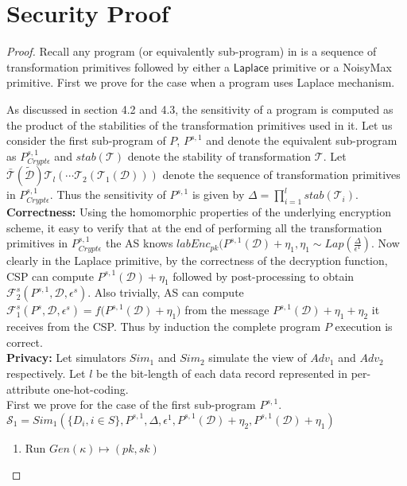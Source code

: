 \section{Security Proof}
\begin{proof}
Recall any program (or equivalently sub-program) in \system is a sequence of transformation primitives followed by either a $\textsf{Laplace}$ primitive or a \textsf{NoisyMax} primitive. First we prove for the case when a program uses Laplace mechanism.

As discussed in section 4.2 and 4.3, the sensitivity of a \system program is computed as the product of the stabilities of the transformation primitives used in it.
Let us consider the first sub-program of $P$, $P^{s,1}$ and denote the equivalent \system sub-program as $P^{s,1}_{Crypt\epsilon}$ and $stab(\mathcal{T})$ denote the stability of transformation $\mathcal{T}$. Let $\bar{\mathcal{T}}(\boldsymbol{\tilde{\mathcal{D}}})\mathcal{T}_l(\cdots\mathcal{T}_2(\mathcal{T}_1(\mathcal{D})))$ denote the sequence of transformation primitives in $P^{s,1}_{Crypt\epsilon}$. Thus the sensitivity of $P^{s,1}$ is given by $\Delta=\prod_{i=1}^l stab(\mathcal{T}_i)$.\\
\textbf{Correctness:}
 Using the homomorphic properties of the underlying encryption
scheme, it easy to verify that at the end of performing all the transformation primitives in $P^{s,1}_{Crypt\epsilon}$ the \textsf{AS} knows $labEnc_{pk}(P^{s,1}(\mathcal{D})+\eta_1, \eta_1 \sim Lap(\frac{\Delta}{\epsilon^1})$.  Now clearly in the \textsf{Laplace} primitive, by the correctness of the decryption function, \textsf{CSP} can compute $P^{s,1}(\mathcal{D})+\eta_1$ followed by post-processing to obtain $\mathcal{F}^s_2(P^{s,1},\mathcal{D},\epsilon^s)$. Also trivially, \textsf{AS} can compute $\mathcal{F}^s_1(P^s,\mathcal{D},\epsilon^s)=f\big(P^{s,1}(\mathcal{D})+\eta_1\big)$ from the message $P^{s,1}(\mathcal{D})+\eta_1+\eta_2$ it receives from the \textsf{CSP}. Thus by induction the complete program  $P$ execution is correct.  \\
\textbf{Privacy:}
Let simulators $Sim_1$ and $Sim_2$ simulate the view of ${Adv}_1$ and $Adv_2$ respectively. 
Let $l$ be the bit-length of each data record represented in per-attribute one-hot-coding. \\
First we prove for the case of the first sub-program $P^{s,1}$. 
$\mathcal{S}_1=Sim_1(\{D_i, i \in S\}, P^{s,1},\Delta,\epsilon^1, P^{s,1}(\mathcal{D})+\eta_2,P^{s,1}(\mathcal{D})+\eta_1)$
\begin{enumerate}\item Run $Gen(\kappa)\mapsto (pk,sk)$ 

\end{enumerate}
\end{proof}
